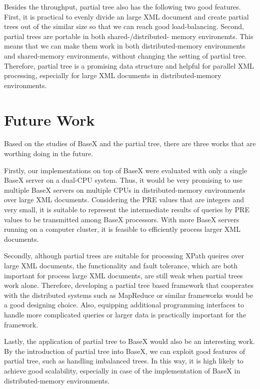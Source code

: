 Besides the throughput, partial tree also has the following two good features.
First, it is practical to evenly divide an large XML document and create partial
trees out of the similar size so that we can reach good load-balancing. Second,
partial trees are portable in both shared-/distributed- memory environemts. This
means that we can make them work in both distributed-memory environments and
shared-memory environments, without changing the setting of partial tree.
Therefore, partial tree is a promising data structure and helpful for parallel
XML processing, especially for large XML documents in distributed-memory
environments.

\section{Future Work}

Based on the studies of BaseX and the partial tree, there are three works that
are worthing doing in the future.

Firstly, our implementations on top of BaseX were evaluated with only a single
BaseX server on a dual-CPU system. Thus, it would be very promising to use
multiple BaseX servers on multiple CPUs in distributed-memory environments over
large XML documents. Considering the PRE values that are integers and very
small, it is suitable to represent the intermediate results of queries by PRE
values to be transmitted among BaseX processors. With more BaseX servers running
on a computer cluster, it is feasible to efficiently process larger XML
documents.

Secondly, although partial trees are suitable for processing XPath queires over
large XML documents, the functionality and fault tolerance, which are both
important for process large XML documents, are still weak when partial trees
work alone. Therefore, developing a partial tree based framework that cooperates
with the distributed systems such as MapReduce or similar frameworks would be a
good designing choice. Also, equipping additional programming interfaces to
handle more complicated queries or larger data is practically important for the
framework.

Lastly, the application of partial tree to BaseX would also be an interesting
work. By the introduction of partial tree into BaseX, we can exploit good
features of partial tree, such as handling imbalanced trees. In this way, it is
high likely to achieve good scalability, especially in case of the
implementation of BaseX in distributed-memory environments.


